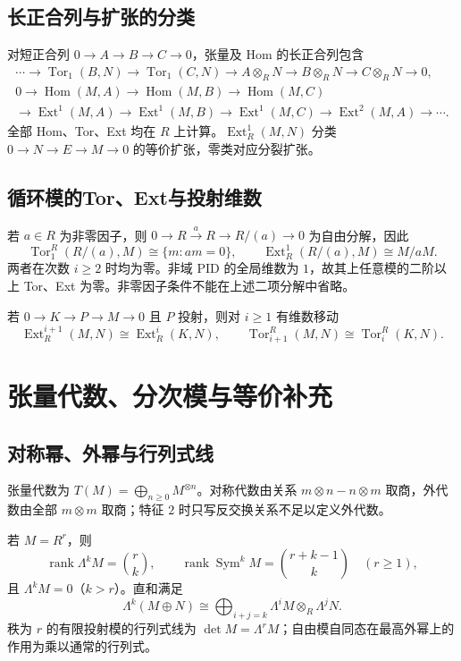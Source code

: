 \documentclass[../main.tex]{subfiles}
\begin{document}
\subsection{长正合列与扩张的分类}
对短正合列 $0\to A\to B\to C\to0$，张量及 Hom 的长正合列包含
\begin{gather*}
\cdots\to\operatorname{Tor}_1(B,N)\to\operatorname{Tor}_1(C,N)
\to A\otimes_RN\to B\otimes_RN\to C\otimes_RN\to0,\\
0\to\operatorname{Hom}(M,A)\to\operatorname{Hom}(M,B)\to\operatorname{Hom}(M,C)\\
\to\operatorname{Ext}^1(M,A)\to\operatorname{Ext}^1(M,B)\to\operatorname{Ext}^1(M,C)\to\operatorname{Ext}^2(M,A)\to\cdots.
\end{gather*}
全部 Hom、Tor、Ext 均在 $R$ 上计算。$\operatorname{Ext}_R^1(M,N)$ 分类 $0\to N\to E\to M\to0$ 的等价扩张，零类对应分裂扩张。

\subsection{循环模的Tor、Ext与投射维数}
若 $a\in R$ 为非零因子，则 $0\to R\xrightarrow{a}R\to R/(a)\to0$ 为自由分解，因此
\[
\operatorname{Tor}_1^R(R/(a),M)\cong\{m:am=0\},\qquad
\operatorname{Ext}_R^1(R/(a),M)\cong M/aM.
\]
两者在次数 $i\ge2$ 时均为零。非域 PID 的全局维数为 $1$，故其上任意模的二阶以上 Tor、Ext 为零。非零因子条件不能在上述二项分解中省略。

若 $0\to K\to P\to M\to0$ 且 $P$ 投射，则对 $i\ge1$ 有维数移动
\[
\operatorname{Ext}_R^{i+1}(M,N)\cong\operatorname{Ext}_R^i(K,N),\qquad
\operatorname{Tor}_{i+1}^R(M,N)\cong\operatorname{Tor}_i^R(K,N).
\]

\section{张量代数、分次模与等价补充}
\subsection{对称幂、外幂与行列式线}
张量代数为 $T(M)=\bigoplus_{n\ge0}M^{\otimes n}$。对称代数由关系 $m\otimes n-n\otimes m$ 取商，外代数由全部 $m\otimes m$ 取商；特征 $2$ 时只写反交换关系不足以定义外代数。

若 $M=R^r$，则
\[
\operatorname{rank}\Lambda^kM=\binom rk,\qquad
\operatorname{rank}\operatorname{Sym}^kM=\binom{r+k-1}k\quad(r\ge1),
\]
且 $\Lambda^kM=0$（$k>r$）。直和满足
\[
\Lambda^k(M\oplus N)\cong\bigoplus_{i+j=k}\Lambda^iM\otimes_R\Lambda^jN.
\]
秩为 $r$ 的有限投射模的行列式线为 $\det M=\Lambda^rM$；自由模自同态在最高外幂上的作用为乘以通常的行列式。
\end{document}
